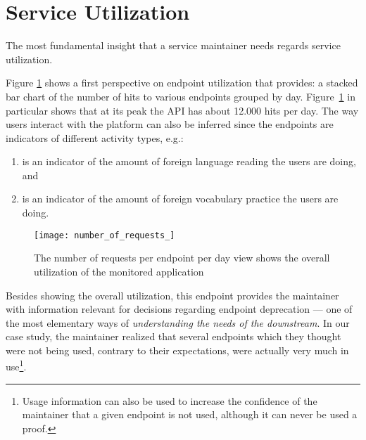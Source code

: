 
\section{Service Utilization}
\label{sec:util}

  The most fundamental insight that a service maintainer needs regards service utilization. %

  Figure \ref{fig:aeu} shows a first perspective on endpoint utilization that \tool provides: a stacked bar chart of the number of hits to various endpoints grouped by day. Figure~\ref{fig:aeu} in particular shows that at its peak the API has about 12.000 hits per day. 
  The way users interact with the platform can also be inferred since the endpoints are indicators of different activity types, e.g.: 

  \begin{enumerate}

    \item \epTranslations is an indicator of the amount of foreign language reading the users are doing, and 

    \item {\color{mygreen} \epOutcome} is an indicator of the amount of foreign vocabulary practice the users are doing.

  \end{enumerate}


  \begin{figure}[!ht]
    \centering
    \texttt{[image: number\_of\_requests\_]}
    \caption{The number of requests per endpoint per day view shows the overall utilization of the monitored application}
    \label{fig:aeu}
  \end{figure}

  Besides showing the overall utilization, this endpoint provides the maintainer with information relevant for decisions regarding endpoint deprecation --- one of the most elementary ways of {\em understanding the needs of the downstream}\cite{Haen14a}. In our case study, the maintainer realized that several endpoints which they thought were not being used, contrary to their expectations, were actually very much in use\footnote{Usage information can also be used to increase the confidence of the maintainer that a given endpoint is not used, although it can never be used a proof.}.

  \niceseparator

